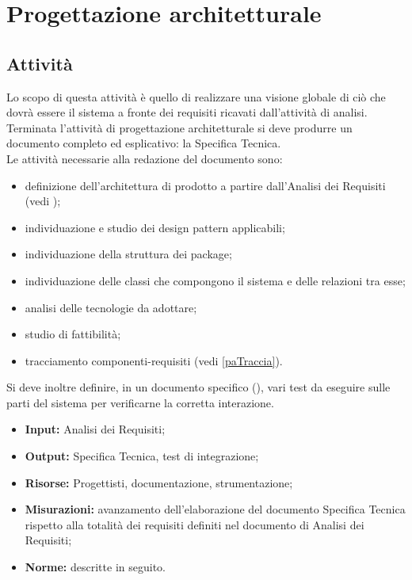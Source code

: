 \section{Progettazione architetturale} {
\subsection{Attività}{
Lo scopo di questa attività è quello di realizzare una visione globale di ciò che dovrà essere il sistema a fronte dei requisiti ricavati dall'attività di analisi.\\
Terminata l'attività di progettazione architetturale si deve produrre un documento completo ed esplicativo: la Specifica Tecnica.\\
Le attività necessarie alla redazione del documento  sono:
\begin{itemize}
	\item definizione dell'architettura di prodotto a partire dall'Analisi dei Requisiti (vedi \textit{\AnalisiDeiRequisiti});
	\item individuazione e studio dei design pattern applicabili;
	\item individuazione della struttura dei package;
	\item individuazione delle classi che compongono il sistema e delle relazioni tra esse;
	\item analisi delle tecnologie da adottare;
	\item studio di fattibilità;
	\item tracciamento componenti-requisiti (vedi \ref{paTraccia}).
\end{itemize}
Si deve inoltre definire, in un documento specifico (\textit{\PianoDiQualifica}), vari test da eseguire sulle parti del sistema per verificarne la corretta interazione.
\begin{itemize}
	\item []{\textbf{Input:} Analisi dei Requisiti;}
	\item []{\textbf{Output:} Specifica Tecnica, test di integrazione;}
	\item []{\textbf{Risorse:} Progettisti, documentazione, strumentazione;}
	\item []{\textbf{Misurazioni:} avanzamento dell'elaborazione del documento Specifica Tecnica rispetto alla totalità dei requisiti definiti nel documento di Analisi dei Requisiti;}
	\item []{\textbf{Norme:} descritte in seguito.}
\end{itemize}

}}
